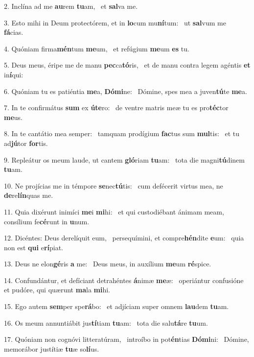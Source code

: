 2. Inclína ad me \textbf{au}rem \textbf{tu}am, \ast\  et \textbf{sal}va me.\

3. Esto mihi in Deum protectórem, et in \textbf{lo}cum mu\textbf{ní}tum: \ast\  ut \textbf{sal}vum me \textbf{fá}cias.\

4. Quóniam firma\textbf{mén}tum \textbf{me}um, \ast\  et refúgium \textbf{me}um \textbf{es} tu.\

5. Deus meus, éripe me de manu \textbf{pec}ca\textbf{tó}ris, \ast\  et de manu contra legem agéntis \textbf{et} in\textbf{í}qui:\

6. Quóniam tu es patiéntia \textbf{me}a, \textbf{Dó}\textbf{mi}ne: \ast\  Dómine, spes mea a juven\textbf{tú}te \textbf{me}a.\

7. In te confirmátus \textbf{sum} ex \textbf{ú}\textbf{te}ro: \ast\  de ventre matris meæ tu es pro\textbf{téc}tor \textbf{me}us.\

8. In te cantátio mea semper: \dag\  tamquam prodígium \textbf{fac}tus sum \textbf{mul}tis: \ast\  et tu ad\textbf{jú}tor \textbf{for}tis.\

9. Repleátur os meum laude, ut cantem \textbf{gló}riam \textbf{tu}am: \ast\  tota die magni\textbf{tú}dinem \textbf{tu}am.\

10. Ne projícias me in témpore \textbf{se}nec\textbf{tú}tis: \ast\  cum defécerit virtus mea, ne \textbf{de}re\textbf{lín}quas me.\

11. Quia dixérunt inimíci \textbf{me}i \textbf{mi}hi: \ast\  et qui custodiébant ánimam meam, consílium fe\textbf{cé}runt in \textbf{u}num.\

12. Dicéntes: Deus derelíquit eum, \dag\  persequímini, et compre\textbf{hén}dite \textbf{e}um: \ast\  quia non est \textbf{qui} e\textbf{rí}piat.\

13. Deus ne elon\textbf{gé}ris \textbf{a} me: \ast\  Deus meus, in auxílium \textbf{me}um \textbf{ré}spice.\

14. Confundántur, et defíciant detrahéntes \textbf{á}nimæ \textbf{me}æ: \ast\  operiántur confusióne et pudóre, qui quærunt \textbf{ma}la \textbf{mi}hi.\

15. Ego autem \textbf{sem}per spe\textbf{rá}bo: \ast\  et adjíciam super omnem \textbf{lau}dem \textbf{tu}am.\

16. Os meum annuntiábit jus\textbf{tí}tiam \textbf{tu}am: \ast\  tota die salu\textbf{tá}re \textbf{tu}um.\

17. Quóniam non cognóvi litteratúram, \dag\  introíbo in pot\textbf{én}tias \textbf{Dó}\textbf{mi}ni: \ast\  Dómine, memorábor justítiæ \textbf{tu}æ so\textbf{lí}us.\

